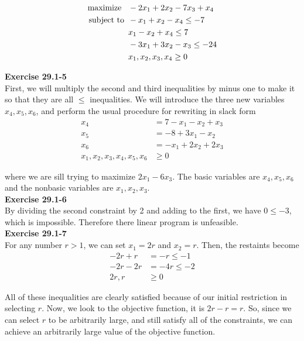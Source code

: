 \documentclass{article}
\begin{document}
\begin{align*}
\mbox{maximize \,\,\,} & -2x_1 + 2x_2 - 7x_3 + x_4 \\
\mbox{subject to \,} & -x_1 + x_2 - x_4 \leq -7 \\
& x_1 - x_2 + x_4 \leq 7 \\
& -3x_1 + 3x_2 - x_3 \leq -24 \\
& x_1,x_2,x_3,x_4 \geq 0
\end{align*}


\noindent\textbf{Exercise 29.1-5}\\

First, we will multiply the second and third inequalities by minus one to make it so that they are all $\le$ inequalities. We will introduce the three new variables $x_4,x_5,x_6$, and perform the usual procedure for rewriting in slack form
\begin{align*}
x_4 &= 7-x_1 - x_2 +x_3\\
x_5 &= -8 +3x_1 - x_2\\
x_6 &= -x_1+2x_2 +2x_3\\
x_1,x_2,x_3,x_4,x_5,x_6 &\ge 0
\end{align*}

where we are sill trying to maximize $2x_1 -6x_3$. The basic variables are $x_4,x_5,x_6$ and the nonbasic variables are $x_1,x_2,x_3$.\\

\noindent\textbf{Exercise 29.1-6}\\

By dividing the second constraint by 2 and adding to the first, we have $0 \leq -3$, which is impossible.  Therefore there linear program is unfeasible. \\

\noindent\textbf{Exercise 29.1-7}\\

For any number $r>1$, we can set $x_1 = 2r$ and $x_2 = r$. Then, the restaints become
\begin{align*}
-2r +r &= -r \le -1\\
-2r -2r &=-4r \le -2\\
2r,r &\ge 0
\end{align*}

All of these inequalities are clearly satisfied because of our initial restriction in selecting $r$. Now, we look to the objective function, it is $2r -r = r$. So, since we can select $r$ to be arbitrarily large, and still satisfy all of the constraints, we can achieve an arbitrarily large value of the objective function.\\
\end{document}

